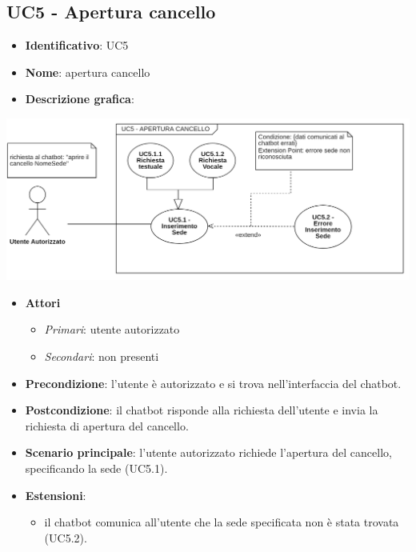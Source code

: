 \subsection{UC5 - Apertura cancello}
\begin{itemize}
    \item \textbf{Identificativo}: UC5
    \item \textbf{Nome}: apertura cancello
    \item \textbf{Descrizione grafica}:
\end{itemize}

\begin{center}
    \includegraphics{images/UC5.png} 
\end{center} 

 \begin{itemize}
    \item \textbf{Attori}
 \begin{itemize} 
    \item \textit{Primari}: utente autorizzato
    \item \textit{Secondari}: non presenti
 \end{itemize}
 \item \textbf{Precondizione}: l'utente è autorizzato e si trova nell'interfaccia del chatbot.
 \item \textbf{Postcondizione}: il chatbot risponde alla richiesta dell'utente e invia la richiesta di apertura del cancello.
 \item \textbf{Scenario principale}: l'utente autorizzato richiede l'apertura del cancello, specificando la sede (UC5.1).
 \item \textbf{Estensioni}: 
 \begin{itemize} 
    \item il chatbot comunica all'utente che la sede specificata non è stata trovata (UC5.2).
 \end{itemize}
\end{itemize}
\newpage
